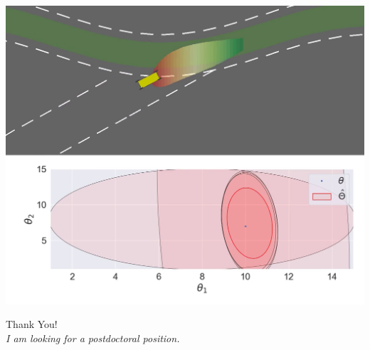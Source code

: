 \documentclass[slideopt,A4,showboxes,svgnames]{beamer}
\begin{document}
\begin{frame}
\begin{center}
	\href{https://youtu.be/axurBzHRLGY}{\includegraphics[width=0.8\linewidth]{img/lateral_control}}
\end{center}
\end{frame}

\begin{frame}
\centering \LARGE Thank You!\\[1cm]
\large \emph{I am looking for a postdoctoral position.}
\end{frame}
\end{document}
